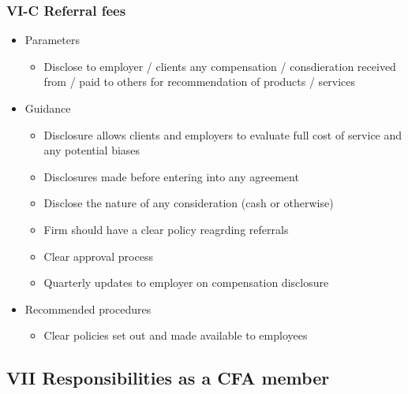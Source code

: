 \documentclass[../notes_compiled.tex]{subfiles}
\begin{document}
\subsubsection{VI-C Referral fees}
\begin{itemize}
\item Parameters
\begin{itemize}
\item Disclose to employer / clients any compensation / consdieration received from / paid to others for recommendation of products / services
\end{itemize}
\item Guidance
\begin{itemize}
\item Disclosure allows clients and employers to evaluate full cost of service and any potential biases
\item Disclosures made before entering into any agreement
\item Disclose the nature of any consideration (cash or otherwise)
\item Firm should have a clear policy reagrding referrals
\item Clear approval process
\item Quarterly updates to employer on compensation disclosure
\end{itemize}
\item Recommended procedures
\begin{itemize}
\item Clear policies set out and made available to employees
\end{itemize}
\end{itemize}
\subsection{VII Responsibilities as a CFA member}
\end{document}
